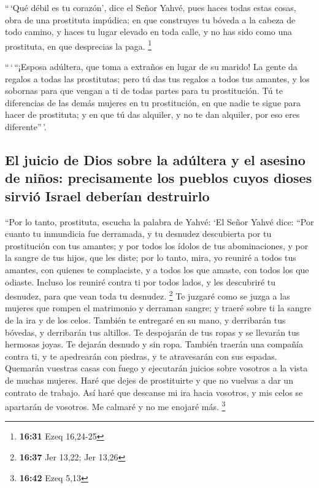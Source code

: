 \begin{paracol}{2}
 ``\,`Qué débil es tu corazón', dice el Señor Yahvé, pues
haces todas estas cosas, obra de una prostituta impúdica;
 en que construyes tu bóveda a la cabeza de todo camino,
y haces tu lugar elevado en toda calle, y no has sido como una
prostituta, en que desprecias la paga. \footnote{\textbf{16:31} Ezeq
  16,24-25}

 ``\,`\,``¡Esposa adúltera, que toma a extraños en lugar
de su marido!  La gente da regalos a todas las
prostitutas; pero tú das tus regalos a todos tus amantes, y los sobornas
para que vengan a ti de todas partes para tu prostitución.
 Tú te diferencias de las demás mujeres en tu
prostitución, en que nadie te sigue para hacer de prostituta; y en que
tú das alquiler, y no te dan alquiler, por eso eres diferente''\,'.

\hypertarget{el-juicio-de-dios-sobre-la-aduxfaltera-y-el-asesino-de-niuxf1os-precisamente-los-pueblos-cuyos-dioses-sirviuxf3-israel-deberuxedan-destruirlo}{%
\subsection{El juicio de Dios sobre la adúltera y el asesino de niños:
precisamente los pueblos cuyos dioses sirvió Israel deberían
destruirlo}\label{el-juicio-de-dios-sobre-la-aduxfaltera-y-el-asesino-de-niuxf1os-precisamente-los-pueblos-cuyos-dioses-sirviuxf3-israel-deberuxedan-destruirlo}}

 ``Por lo tanto, prostituta, escucha la palabra de Yahvé:
 `El Señor Yahvé dice: ``Por cuanto tu inmundicia fue
derramada, y tu desnudez descubierta por tu prostitución con tus
amantes; y por todos los ídolos de tus abominaciones, y por la sangre de
tus hijos, que les diste;  por lo tanto, mira, yo reuniré
a todos tus amantes, con quienes te complaciste, y a todos los que
amaste, con todos los que odiaste. Incluso los reuniré contra ti por
todos lados, y les descubriré tu desnudez, para que vean toda tu
desnudez. \footnote{\textbf{16:37} Jer 13,22; Jer 13,26} 
Te juzgaré como se juzga a las mujeres que rompen el matrimonio y
derraman sangre; y traeré sobre ti la sangre de la ira y de los celos.
 También te entregaré en su mano, y derribarán tus
bóvedas, y derribarán tus altillos. Te despojarán de tus ropas y se
llevarán tus hermosas joyas. Te dejarán desnudo y sin ropa.
 También traerán una compañía contra ti, y te apedrearán
con piedras, y te atravesarán con sus espadas.  Quemarán
vuestras casas con fuego y ejecutarán juicios sobre vosotros a la vista
de muchas mujeres. Haré que dejes de prostituirte y que no vuelvas a dar
un contrato de trabajo.  Así haré que descanse mi ira
hacia vosotros, y mis celos se apartarán de vosotros. Me calmaré y no me
enojaré más. \footnote{\textbf{16:42} Ezeq 5,13}


\end{paracol}
